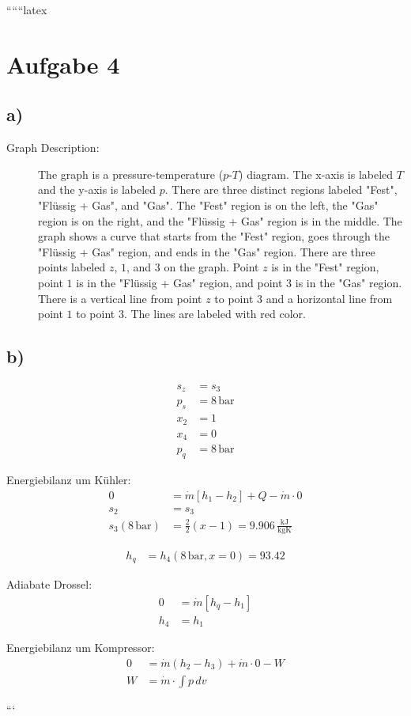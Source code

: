 
``````latex


\section*{Aufgabe 4}

\subsection*{a)}

\begin{description}
    \item[Graph Description:] The graph is a pressure-temperature ($p$-$T$) diagram. The x-axis is labeled $T$ and the y-axis is labeled $p$. There are three distinct regions labeled "Fest", "Flüssig + Gas", and "Gas". The "Fest" region is on the left, the "Gas" region is on the right, and the "Flüssig + Gas" region is in the middle. The graph shows a curve that starts from the "Fest" region, goes through the "Flüssig + Gas" region, and ends in the "Gas" region. There are three points labeled $z$, $1$, and $3$ on the graph. Point $z$ is in the "Fest" region, point $1$ is in the "Flüssig + Gas" region, and point $3$ is in the "Gas" region. There is a vertical line from point $z$ to point $3$ and a horizontal line from point $1$ to point $3$. The lines are labeled with red color.
\end{description}

\subsection*{b)}

\begin{align*}
    s_z &= s_3 \\
    p_s &= 8 \, \text{bar} \\
    x_2 &= 1 \\
    x_4 &= 0 \\
    p_q &= 8 \, \text{bar}
\end{align*}

Energiebilanz um Kühler:
\begin{align*}
    0 &= \dot{m} [h_1 - h_2] + Q - \dot{m} \cdot 0 \\
    s_2 &= s_3 \\
    s_3(8 \, \text{bar}) &= \frac{2}{2} (x - 1) = 9.906 \, \frac{\text{kJ}}{\text{kgK}}
\end{align*}

\begin{align*}
    h_q &= h_{4}(8 \, \text{bar}, x = 0) = 93.42
\end{align*}

Adiabate Drossel:
\begin{align*}
    0 &= \dot{m} [h_q - h_1] \\
    h_4 &= h_1
\end{align*}

Energiebilanz um Kompressor:
\begin{align*}
    0 &= \dot{m} (h_2 - h_3) + \dot{m} \cdot 0 - W \\
    W &= \dot{m} \cdot \int p \, dv
\end{align*}

```